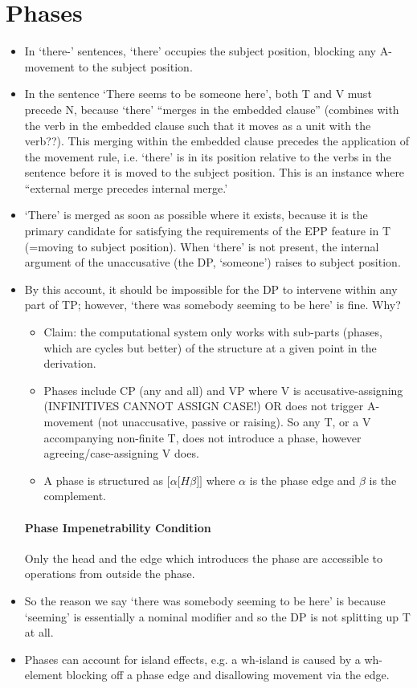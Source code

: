 \documentclass{article}
\begin{document}
\section{Phases}
\begin{itemize}
    \item In `there-' sentences, `there' occupies the subject position, blocking any A-movement to the subject position.
    \item In the sentence `There seems to be someone here', both T and V must precede N, because `there' ``merges in the embedded clause'' (combines with the verb in the embedded clause such that it moves as a unit with the verb??). This merging within the embedded clause precedes the application of the movement rule, i.e. `there' is in its position relative to the verbs in the sentence before it is moved to the subject position. This is an instance where ``external merge precedes internal merge.'
    \item `There' is merged as soon as possible where it exists, because it is the primary candidate for satisfying the requirements of the EPP feature in T (=moving to subject position). When `there' is not present, the internal argument of the unaccusative (the DP, `someone') raises to subject position.
    \item By this account, it should be impossible for the DP to intervene within any part of TP; however, `there was somebody seeming to be here' is fine. Why?
    \begin{itemize}
        \item Claim: the computational system only works with sub-parts (phases, which are cycles but better) of the structure at a given point in the derivation.
        \item Phases include CP (any and all) and VP where V is accusative-assigning (INFINITIVES CANNOT ASSIGN CASE!) OR does not trigger A-movement (not unaccusative, passive or raising). So any T, or a V accompanying non-finite T, does not introduce a phase, however agreeing/case-assigning V does.
        \item A phase is structured as $\lbrack \alpha \lbrack H \beta \rbrack \rbrack $ where $\alpha$ is the phase edge and $\beta$ is the complement.
    \end{itemize}
    \paragraph{Phase Impenetrability Condition} Only the head and the edge which introduces the phase are accessible to operations from outside the phase.
    \item So the reason we say `there was somebody seeming to be here' is because `seeming' is essentially a nominal modifier and so the DP is not splitting up T at all.
    \item Phases can account for island effects, e.g. a wh-island is caused by a wh-element blocking off a phase edge and disallowing movement via the edge.

\end{itemize}
\end{document}
